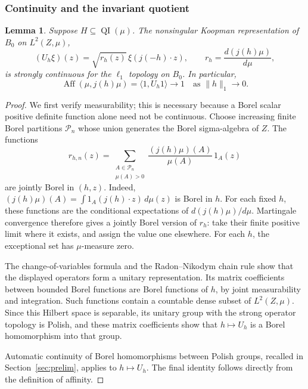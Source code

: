 \documentclass[11pt]{article}
\numberwithin{equation}{section}
\newtheorem{lemma}[theorem]{Lemma}
\theoremstyle{definition}
\newcommand{\Aff}{\operatorname{Aff}}
\newcommand{\QI}{\operatorname{QI}}
\begin{document}
\subsubsection{Continuity and the invariant quotient}

\begin{lemma}\label{lem:koopman-continuity}
Suppose $H\subseteq\QI(\mu)$. The nonsingular Koopman representation
of $B_0$ on $L^2(Z,\mu)$,
\[
 (U_h\xi)(z)
   =\sqrt{r_h(z)}\,\xi(j(-h)\cdot z),
 \qquad r_h=\frac{d(j(h)\mu)}{d\mu},
\]
is strongly continuous for the $\ell_1$ topology on $B_0$.
In particular,
\[
 \Aff(\mu,j(h)\mu)=\langle 1,U_h1\rangle\longrightarrow1
 \quad\text{as }\|h\|_1\longrightarrow0.
\]
\end{lemma}

\begin{proof}
We first verify measurability; this is necessary because a Borel scalar
positive definite function alone need not be continuous. Choose
increasing finite Borel partitions $\mathcal P_n$ whose union generates
the Borel sigma-algebra of $Z$. The functions
\[
 r_{h,n}(z)=
 \sum_{\substack{A\in\mathcal P_n\\\mu(A)>0}}
       \frac{(j(h)\mu)(A)}{\mu(A)}\,1_A(z)
\]
are jointly Borel in $(h,z)$. Indeed,
$(j(h)\mu)(A)=\int 1_A(j(h)\cdot z)\,d\mu(z)$ is Borel in $h$.
For each fixed $h$, these functions are the conditional expectations
of $d(j(h)\mu)/d\mu$. Martingale convergence therefore gives a jointly
Borel version of $r_h$: take their finite positive limit where it
exists, and assign the value one elsewhere. For each $h$, the
exceptional set has $\mu$-measure zero.

The change-of-variables formula and the Radon--Nikodym chain rule show
that the displayed operators form a unitary representation. Its matrix
coefficients between bounded Borel functions are Borel functions of
$h$, by joint measurability and integration. Such functions contain a
countable dense subset of $L^2(Z,\mu)$. Since this Hilbert space is
separable, its unitary group with the strong operator topology is
Polish, and these matrix coefficients show that $h\mapsto U_h$ is a
Borel homomorphism into that group.

Automatic continuity of Borel homomorphisms between Polish groups,
recalled in Section~\ref{sec:prelim}, applies to $h\mapsto U_h$.
The final identity follows directly from the definition of affinity.
\end{proof}
\end{document}
